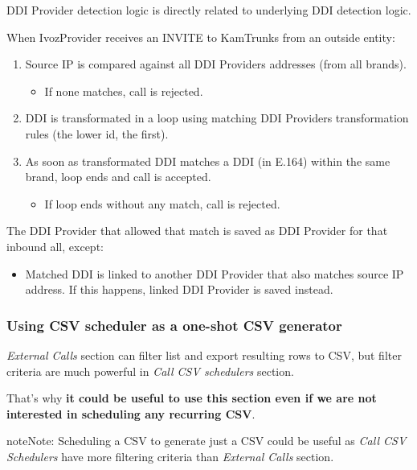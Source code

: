 \documentclass[letterpaper,10pt,english]{sphinxmanual}
\begin{document}
DDI Provider detection logic is directly related to underlying DDI detection logic.

When IvozProvider receives an INVITE to KamTrunks from an outside entity:
\begin{enumerate}
\item {} 
Source IP is compared against all DDI Providers addresses (from all brands).
\begin{itemize}
\item {} 
If none matches, call is rejected.

\end{itemize}

\item {} 
DDI is transformated in a loop using matching DDI Providers transformation rules (the lower id, the first).

\item {} 
As soon as transformated DDI matches a DDI (in E.164) within the same brand, loop ends and call is accepted.
\begin{itemize}
\item {} 
If loop ends without any match, call is rejected.

\end{itemize}

\end{enumerate}

The DDI Provider that allowed that match is saved as DDI Provider for that inbound all, except:
\begin{itemize}
\item {} 
Matched DDI is linked to another DDI Provider that also matches source IP address. If this happens, linked DDI Provider
is saved instead.

\end{itemize}


\subsubsection{Using CSV scheduler as a one-shot CSV generator}
\label{administration_portal/brand/calls/call_csv_schedulers:using-csv-scheduler-as-a-one-shot-csv-generator}
\emph{External Calls} section can filter list and export resulting rows to CSV, but filter criteria are much powerful in
\emph{Call CSV schedulers} section.

That's why \textbf{it could be useful to use this section even if we are not interested in scheduling any recurring CSV}.

\begin{notice}{note}{Note:}
Scheduling a CSV to generate just a CSV could be useful as \emph{Call CSV Schedulers} have more filtering criteria
than \emph{External Calls} section.
\end{notice}
\end{document}
